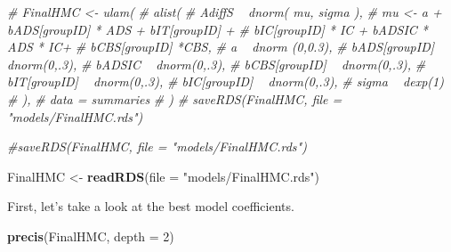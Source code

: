 \documentclass[10pt,dvipsnames,enabledeprecatedfontcommands]{scrartcl}
\newenvironment{Shaded}{\begin{snugshade}}{\end{snugshade}}
\newcommand{\KeywordTok}[1]{\textcolor[rgb]{0.13,0.29,0.53}{\textbf{#1}}}
\newcommand{\DataTypeTok}[1]{\textcolor[rgb]{0.13,0.29,0.53}{#1}}
\newcommand{\DecValTok}[1]{\textcolor[rgb]{0.00,0.00,0.81}{#1}}
\newcommand{\StringTok}[1]{\textcolor[rgb]{0.31,0.60,0.02}{#1}}
\newcommand{\CommentTok}[1]{\textcolor[rgb]{0.56,0.35,0.01}{\textit{#1}}}
\newcommand{\NormalTok}[1]{#1}
\begin{document}
\begin{Shaded}
\begin{Highlighting}[]
\CommentTok{# FinalHMC <- ulam(}
\CommentTok{#   alist(}
\CommentTok{#     AdiffS ~ dnorm( mu, sigma ),}
\CommentTok{#     mu <- a + bADS[groupID] * ADS +  bIT[groupID] +}
\CommentTok{#     bIC[groupID] * IC + bADSIC * ADS * IC+}
\CommentTok{#     bCBS[groupID] *CBS,}
\CommentTok{#     a ~ dnorm (0,0.3),}
\CommentTok{#     bADS[groupID] ~ dnorm(0,.3),}
\CommentTok{#     bADSIC ~ dnorm(0,.3),}
\CommentTok{#     bCBS[groupID] ~ dnorm(0,.3),}
\CommentTok{#     bIT[groupID] ~ dnorm(0,.3),}
\CommentTok{#     bIC[groupID] ~ dnorm(0,.3),}
\CommentTok{#     sigma  ~ dexp(1)}
\CommentTok{#   ),}
\CommentTok{#   data = summaries}
\CommentTok{# )}
\CommentTok{# saveRDS(FinalHMC, file = "models/FinalHMC.rds")}


\CommentTok{#saveRDS(FinalHMC, file = "models/FinalHMC.rds")}

\NormalTok{FinalHMC <-}\StringTok{ }\KeywordTok{readRDS}\NormalTok{(}\DataTypeTok{file =} \StringTok{"models/FinalHMC.rds"}\NormalTok{)}
\end{Highlighting}
\end{Shaded}

\normalsize
First, let's take a look at the best model coefficients.

\vspace{1mm} \footnotesize

\begin{Shaded}
\begin{Highlighting}[]
\KeywordTok{precis}\NormalTok{(FinalHMC, }\DataTypeTok{depth =} \DecValTok{2}\NormalTok{)}
\end{Highlighting}
\end{Shaded}
\end{document}
